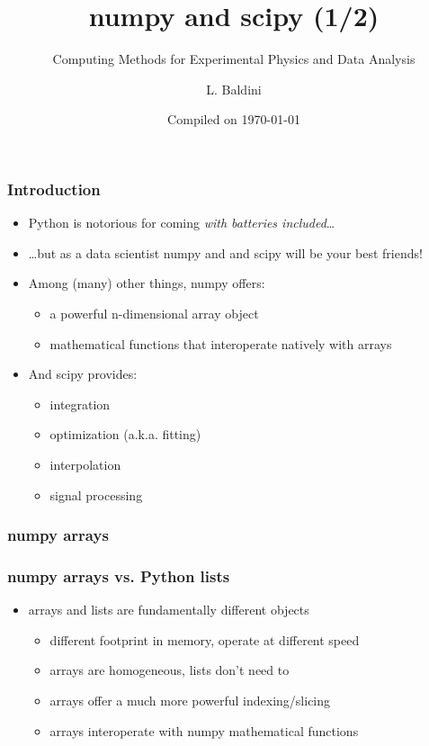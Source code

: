 \documentclass[9pt]{beamer}
\title{numpy and scipy (1/2)}
\subtitle{Computing Methods for Experimental Physics and Data Analysis}
\date{Compiled on \today}
\author{L. Baldini}
\institute[UNIPI and INFN]{Universit\`a and INFN--Pisa}
\begin{document}
\titleframe

\begin{frame}
  \frametitle{Introduction}
  \begin{itemize}
  \item Python is notorious for coming \emph{with batteries included}\ldots
  \item \ldots but as a data scientist numpy and and scipy will be your
    best friends!
  \item Among (many) other things, numpy offers:
    \begin{itemize}
    \item a powerful n-dimensional array object
    \item mathematical functions that interoperate natively with arrays
    \end{itemize}
  \item And scipy provides:
    \begin{itemize}
    \item integration
    \item optimization (a.k.a. fitting)
    \item interpolation
    \item signal processing
    \end{itemize}
  \end{itemize}
\end{frame}


\begin{frame}
  \frametitle{numpy arrays}
  
\end{frame}


\begin{frame}
  \frametitle{numpy arrays vs. Python lists}
  
  
  \begin{itemize}
  \item arrays and lists are fundamentally different objects
    \begin{itemize}
    \item different footprint in memory, operate at different speed
    \item arrays are homogeneous, lists don't need to
    \item arrays offer a much more powerful indexing/slicing
    \item arrays interoperate with numpy mathematical functions
    \end{itemize}
  \end{itemize}
\end{frame}
\end{document}
